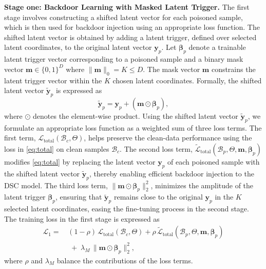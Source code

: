 \documentclass[journal]{IEEEtran}
\begin{document}
\textbf{Stage one: Backdoor Learning with Masked Latent Trigger.}  
The first stage involves constructing a shifted latent vector for each poisoned sample, which is then used for backdoor injection using an appropriate loss function.
The shifted latent vector is obtained by adding a latent trigger, defined over selected latent coordinates, to the original latent vector $\mathbf{y}_p$. Let $\boldsymbol{\beta}_{p}$ denote a trainable latent trigger vector corresponding to a poisoned sample and a binary mask vector \(\mathbf{m} \in \{0, 1\}^D\) where \(\|\mathbf{m}\|_0 = K \leq D\). The mask vector \(\mathbf{m}\)  constrains the latent trigger vector within the $K$ chosen latent coordinates. Formally, the shifted latent vector $\widetilde{\mathbf{y}}_p$ is expressed as
\begin{equation}
\widetilde{\mathbf{y}}_p = \mathbf{y}_p + \left( \mathbf{m} \odot \boldsymbol{\beta}_{p} \right),
\end{equation}
where $\odot$ denotes the element-wise product.
Using the shifted latent vector $\widetilde{\mathbf{y}}_p$, we formulate an appropriate loss function as a weighted sum of three loss terms. The first term, $\mathcal{L}_{\mathrm{total}}(\mathcal{B}_c, \Theta)$, helps preserve the clean-data performance  using the loss in \eqref{eq:total} on clean samples $\mathcal{B}_c$. The second loss term, $\tilde{\mathcal{L}}_{\mathrm{total}}(\mathcal B_p, \Theta, \mathbf{m}, \boldsymbol{\beta}_{p})$ modifies \eqref{eq:total} by replacing the latent vector $\mathbf{y}_p$ of each poisoned sample with  the shifted latent vector $\widetilde{\mathbf{y}}_p$, thereby enabling efficient backdoor injection to the DSC model. 
The third loss term, $\bigl\lVert \mathbf{m}\odot \boldsymbol{\beta}_{p}\bigr\rVert_{2}^{2}$, minimizes the amplitude of the latent trigger $\boldsymbol{\beta}_p$, ensuring that $\widetilde{\mathbf{y}}_p$ remains close to the original  $\mathbf{y}_p$ in the $K$ selected latent coordinates,
easing the fine-tuning process in the second stage. The training loss in the first stage is expressed as
\begin{equation}
\label{eq:L1_with_bs}
\begin{aligned}
\mathcal{L}_{1}
=\, & (1-\rho)\,\mathcal{L}_{\mathrm{total}}(\mathcal{B}_c, \Theta)
+ \rho\,\tilde{\mathcal{L}}_{\mathrm{total}}(\mathcal{B}_p, \Theta, \mathbf{m}, \boldsymbol{\beta}_{p})\\
&\;+\;\lambda_{M}\,\bigl\lVert \mathbf{m}\odot \boldsymbol{\beta}_{p}\bigr\rVert_{2}^{2}
,
\end{aligned}
\end{equation}
where $\rho$ and $\lambda_M$ balance the contributions of the loss terms.
\end{document}
